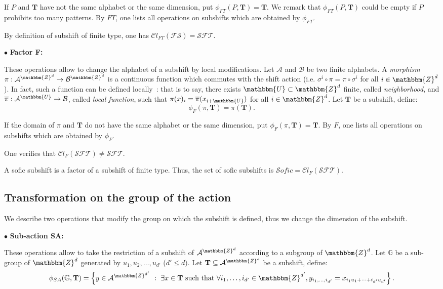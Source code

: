 \documentclass[proceedings]{stacs}
\theoremstyle{plain}\newtheorem{satz}[thm]{Satz}
\theoremstyle{definition}\newtheorem{crucial}[thm]{Crucial Definition}
\newcommand{\G}{\mathbb{G}}
\newcommand{\Z}{\mathbbm{Z}}
\newcommand{\U}{\mathbbm{U}}
\newcommand{\A}{\mathcal{A}}
\newcommand{\B}{\mathcal{B}}
\newcommand{\T}{\mathbf{T}}
\newcommand{\s}{\sigma}
\newcommand{\SFT}{\mathcal{SFT}}
\newcommand{\sofic}{\mathcal{S}ofic}
\newcommand{\fshift}{\mathcal{FS}}
\begin{document}
If $P$ and $\T$ have not the same alphabet or the same dimension, put $\phi_{FT}(P,\T)= \T$. We remark that $\phi_{FT}(P,\T)$ could be empty if $P$ prohibits too many patterns. By $FT$, one lists all operations on subshifts which are obtained by $\phi_{FT}$.

By definition of subshift of finite type, one has $\mathcal{C}l_{FT}(\fshift)=\SFT$.

\noindent$\bullet$ \textbf{Factor F:}

These operations allow to change the alphabet of a subshift by local modifications. Let $\A$ and $\B$ be two finite alphabets. A \emph{morphism} $\pi:\A^{\Z^d}\to\B^{\Z^d}$ is a continuous function which commutes with the shift action (i.e. $\s^i\circ\pi=\pi\circ\s^i$ for all $i\in\Z^d$). In fact, such a function can be defined locally~\cite{hedlund1969eaa}: that is to say, there exists $\U\subset\Z^d$ finite, called \emph{neighborhood}, and $\overline{\pi}:\A^{\U}\to\B$, called \emph{local function}, such that $\pi(x)_i=\overline{\pi}(x_{i+\U})$ for all $i\in\Z^d$. Let $\T$ be a subshift, define:
$$\phi_F(\pi,\T)=\pi(\T).$$

If the domain of $\pi$ and $\T$ do not have the same alphabet or the same dimension, put $ \phi_{F}(\pi,\T)= \T$. By $F$, one lists all operations on subshifts which are obtained by $\phi_{F}$.

One verifies that $\mathcal{C}l_{F}(\SFT)\ne\SFT$.

\begin{definition}
A sofic subshift is a factor of a subshift of finite type. Thus, the set of sofic subshifts is $\sofic=\mathcal{C}l_{F}(\SFT)$.
\end{definition}


	\subsection{Transformation on the group of the action}

We describe two operations that modify the group on which the subshift is defined, thus we change the dimension of the subshift.

\noindent $\bullet$ \textbf{Sub-action SA:}

These operations allow to take the restriction of a subshift of $\A^{\Z^d}$ according to a subgroup of $\Z^d$. Let $\G$ be a sub-group of $\Z^d$ generated by $u_1,u_2,\dots,u_{d'}$ ($d'\leq d)$. Let $\T\subseteq\A^{\Z^d}$ be a subshift, define:
$$\phi_{SA}(\G,\T)=\left\{y\in\A^{\Z^{d'}}\ :\  \exists x\in\T \textrm{ such that } \forall i_1,\dots,i_{d'}\in\Z^{d'}, y_{i_1,\dots,i_{d'}}=x_{i_1u_1+\dots+i_{d'}u_{d'}}\right\}.$$
\end{document}
